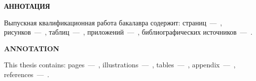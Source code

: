 \begin{center}
    \textbf{АННОТАЦИЯ}
\end{center}

Выпускная квалификационная работа бакалавра содержит: страниц~––~\pageref{LastPage}, рисунков~––~\underline{\hspace{1cm}}, таблиц~––~\underline{\hspace{1cm}}, приложений~––~\underline{\hspace{1cm}}, библиографических источников~––~\underline{\hspace{1cm}}.

\underline{\hspace{\textwidth}}

\underline{\hspace{\textwidth}}

\underline{\hspace{\textwidth}}

\begin{center}
    \textbf{ANNOTATION}
\end{center}

This thesis contains: pages~––~\pageref{LastPage}, illustrations~––~\underline{\hspace{1cm}}, tables~––~\underline{\hspace{1cm}}, appendix~––~\underline{\hspace{1cm}}, references~––~\underline{\hspace{1cm}}.

\underline{\hspace{\textwidth}}

\underline{\hspace{\textwidth}}

\underline{\hspace{\textwidth}}

\newpage
